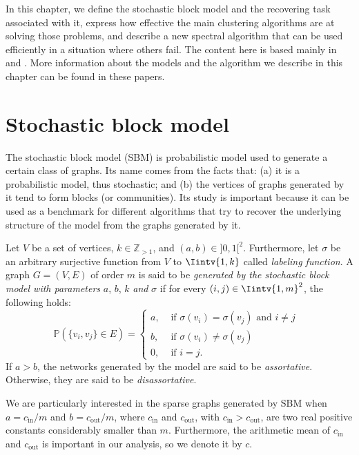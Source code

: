 In this chapter, we define the stochastic block model and the recovering task associated with it, express how effective the main clustering algorithms are at solving those problems, and describe a new spectral algorithm that can be used efficiently in a situation where others fail.
The content here is based mainly in \cite{bethe2} and \cite{bethe}.
More information about the models and the algorithm we describe in this chapter can be found in these papers.


\section{Stochastic block model}
The stochastic block model (SBM) is probabilistic model used to generate a certain class of graphs.
Its name comes from the facts that: (a) it is a probabilistic model, thus stochastic; and (b) the vertices of graphs generated by it tend to form blocks (or communities).
Its study is important because it can be used as a benchmark for different algorithms that try to recover the underlying structure of the model from the graphs generated by it.

\begin{definition}
   Let $V$ be a set of vertices, $k \in \mathbb Z_{>1}$, and $(a,b) \in {]0,1[}^2 $.
   Furthermore, let $\sigma$ be an arbitrary surjective function from $V$ to $\Iintv{1,k}$ called \textit{labeling function}.
   A graph $G=(V,E)$ of order $m$ is said to be \textit{generated by the stochastic block model with parameters} $a$, $b$, $k$ \textit{and} $\sigma$ if for every $(i,j) \in \Iintv{1,m}^2$, the following holds:
   \begin{equation}
      \mathbb P (\{v_i, v_j\} \in E) =
      \begin{cases}
         a, & \text{ if $\sigma (v_i) = \sigma (v_j)$ and $i \ne j$ } \\
         b, & \text{ if $\sigma (v_i) \ne \sigma (v_j)$ } \\
         0, & \text{ if $i = j$. }
      \end{cases}
   \end{equation}
   If $a > b$, the networks generated by the model are said to be \textit{assortative}. 
   Otherwise, they are said to be \textit{disassortative}. 
\end{definition}

\begin{remark}
   We are particularly interested in the sparse graphs generated by SBM when $a = c_{\text{in}}/m$ and $b = c_{\text{out}}/m$, where $c_\text{in}$ and $c_\text{out}$, with $c_\text{in} > c_\text{out}$, are two real positive constants considerably smaller than $m$. 
   Furthermore, the arithmetic mean of $c_\text{in}$ and $c_\text{out}$ is important in our analysis, so we denote it by $c$.
\end{remark}

